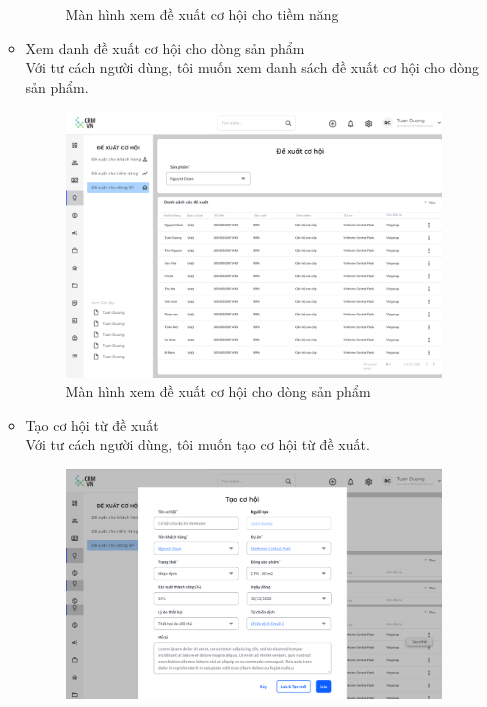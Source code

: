 \documentclass[12pt,a4paper]{article}
\begin{document}
\begin{enumerate}
\begin{itemize}
\begin{figure}[H]
                \vspace{0.5cm}
                \caption{Màn hình xem đề xuất cơ hội cho tiềm năng}
                \label{dexuatcohoiTN}
            \end{figure}
            \item Xem danh đề xuất cơ hội cho dòng sản phẩm \\
            Với tư cách người dùng, tôi muốn xem danh sách đề xuất cơ hội cho dòng sản phẩm.
            \begin{figure}[H]
                \centering \includegraphics[width=\textwidth]{Img/Nguyet/DexuatCohoi/dsdexuatdongsp.png}
                \vspace{0.5cm}
                \caption{Màn hình xem đề xuất cơ hội cho dòng sản phẩm}
                \label{dexuatcohoiDSP}
            \end{figure}
            \item Tạo cơ hội từ đề xuất\\
            Với tư cách người dùng, tôi muốn tạo cơ hội từ đề xuất.
            \begin{figure}[H]
                \centering \includegraphics[width=\textwidth]{Img/Nguyet/DexuatCohoi/taocohodexuat.png}

\end{figure}
\end{itemize}
\end{enumerate}
\end{document}
